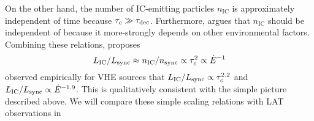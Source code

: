On the other hand, the number of \ac{IC}-emitting particles $n_\text{IC}$
is approximately independent of time because $\tau_c \gg
\tau_\text{dec}$.  Furthermore, \cite{mattana_2009_evolution-gamma-}
argues that $n_\text{IC}$ should be independent of \energydot because it
more-strongly depends on other environmental factors.  Combining these
relations, \cite{mattana_2009_evolution-gamma-} proposes
\begin{equation}
  L_\text{IC}/L_\text{sync} \approx n_\text{IC}/n_\text{sync}
  \propto \tau_c^2 \propto \dot{E}^{-1}
\end{equation}
\cite{mattana_2009_evolution-gamma-} 
observed empirically for \ac{VHE} sources
that $L_\text{IC}/L_\text{sync} \propto
\tau_c^{2.2}$ and $L_\text{IC}/L_\text{sync}
\propto \dot{E}^{-1.9}$. This is qualitatively consistent with the
simple picture described above.  We will compare these simple scaling
relations with \ac{LAT} observations in 
